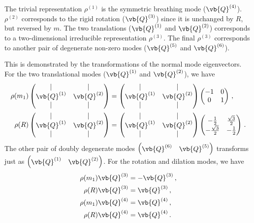 \documentclass{article}
\theoremstyle{plain}\theoremheaderfont{\normalfont\itshape}\theorembodyfont{\rmfamily}\theoremseparator{.}\newtheorem*{rem}{Remark}\newtheorem*{ex}{Example}\newtheorem*{proof}{Proof}\newtheorem*{altp}{Alternative proof}
\theoremstyle{plain}\theoremheaderfont{\normalfont\bfseries}\theorembodyfont{\rmfamily}\theoremseparator{.}\newtheorem{thm}{Theorem}[section]\newtheorem{lem}[thm]{Lemma}\newtheorem{prop}[thm]{Proposition}\newtheorem*{cor}{Corollary}\newtheorem{defn}[thm]{Definition}\newtheorem{clm}[thm]{Claim}\newtheorem{clminproof}{Claim}
\theoremstyle{break}\theoremheaderfont{\normalfont\itshape}\theorembodyfont{\rmfamily}\theoremseparator{.\medskip}\newtheorem*{proofskip}{Proof}\newtheorem*{exs}{Examples}\newtheorem*{rems}{Remarks}
\theoremstyle{break}\theoremheaderfont{\normalfont\bfseries}\theorembodyfont{\rmfamily}\theoremseparator{.\medskip}\newtheorem{lemskip}[thm]{Lemma}\newtheorem{defnskip}[thm]{Definition}\newtheorem{propskip}[thm]{Proposition}\newtheorem{thmskip}[thm]{Theorem}
\numberwithin{equation}{section}
\begin{document}
	The trivial representation \(\rho^{(1)}\) is the symmetric breathing mode (\(\vb{Q}^{(4)}\)). \(\rho^{(2)}\) corresponds to the rigid rotation (\(\vb{Q}^{(3)}\)) since it is unchanged by \(R\), but reversed by \(m\). The two translations (\(\vb{Q}^{(1)}\) and \(\vb{Q}^{(2)}\)) corresponds to a two-dimensional irreducible representation \(\rho^{(3)}\). The final \(\rho^{(3)}\) corresponds to another pair of degenerate non-zero modes (\(\vb{Q}^{(5)}\) and \(\vb{Q}^{(6)}\)).

	This is demonstrated by the transformations of the normal mode eigenvectors. For the two translational modes (\(\vb{Q}^{(1)}\) and \(\vb{Q}^{(2)}\)), we have
	\begin{align*}
		\rho(m_1)\begin{pmatrix}
			| & |\\
			\vb{Q}^{(1)} & \vb{Q}^{(2)}\\
			| & |
		\end{pmatrix}&=\begin{pmatrix}
			| & |\\
			\vb{Q}^{(1)} & \vb{Q}^{(2)}\\
			| & |
		\end{pmatrix}\begin{pmatrix}
			-1 & 0\\
			0 & 1
		\end{pmatrix}\,,\\
		\rho(R)\begin{pmatrix}
			| & |\\
			\vb{Q}^{(1)} & \vb{Q}^{(2)}\\
			| & |
		\end{pmatrix}&=\begin{pmatrix}
			| & |\\
			\vb{Q}^{(1)} & \vb{Q}^{(2)}\\
			| & |
		\end{pmatrix}\begin{pmatrix}
			-\frac{1}{2} & \frac{\sqrt{3}}{2}\\
			-\frac{\sqrt{3}}{2} & -\frac{1}{2}
		\end{pmatrix}\,.
	\end{align*}
	The other pair of doubly degenerate modes \(\begin{pmatrix}\vb{Q}^{(6)}&\vb{Q}^{(5)}\end{pmatrix}\) transforms just as \(\begin{pmatrix}\vb{Q}^{(1)}&\vb{Q}^{(2)}\end{pmatrix}\). For the rotation and dilation modes, we have
	\begin{align*}
		\rho(m_1)\vb{Q}^{(3)}&=-\vb{Q}^{(3)}\,, \\
		\rho(R)\vb{Q}^{(3)}&=\vb{Q}^{(3)}\,, \\
		\rho(m_1)\vb{Q}^{(4)}&=\vb{Q}^{(4)}\,, \\
		\rho(R)\vb{Q}^{(4)}&=\vb{Q}^{(4)}\,.
	\end{align*}
\end{document}
